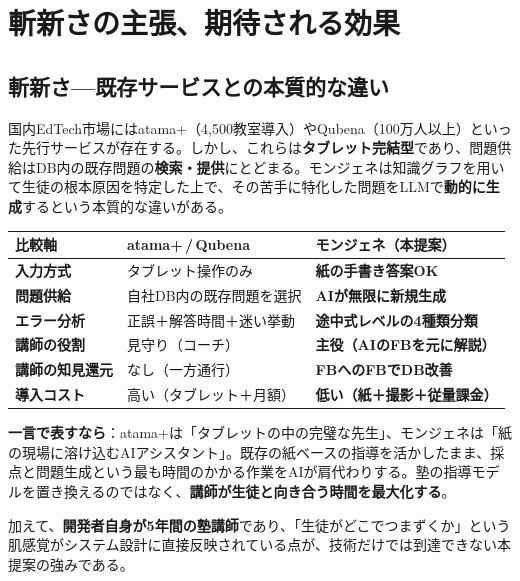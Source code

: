 \documentclass[paper=a4,fontsize=10.5bp,jafontsize=10.5bp]{jlreq}
\begin{document}
\section{斬新さの主張、期待される効果}

\subsection{斬新さ---既存サービスとの本質的な違い}

国内EdTech市場にはatama+（4,500教室導入）やQubena（100万人以上）といった先行サービスが存在する。しかし、これらは\textbf{タブレット完結型}であり、問題供給はDB内の既存問題の\textbf{検索・提供}にとどまる。モンジェネは知識グラフを用いて生徒の根本原因を特定した上で、その苦手に特化した問題をLLMで\textbf{動的に生成}するという本質的な違いがある。


\begin{footnotesize}\noindent
\begin{tabularx}{\linewidth}{>{\bfseries}l X X}
\toprule
比較軸 & atama+\,/\,Qubena & モンジェネ（本提案） \\
\midrule
入力方式 & タブレット操作のみ & \textbf{紙の手書き答案OK} \\
問題供給 & 自社DB内の既存問題を選択 & \textbf{AIが無限に新規生成} \\
エラー分析 & 正誤＋解答時間＋迷い挙動 & \textbf{途中式レベルの4種類分類} \\
講師の役割 & 見守り（コーチ） & \textbf{主役（AIのFBを元に解説）} \\
講師の知見還元 & なし（一方通行） & \textbf{FBへのFBでDB改善} \\
導入コスト & 高い（タブレット＋月額） & \textbf{低い（紙＋撮影＋従量課金）} \\
\bottomrule
\end{tabularx}
\end{footnotesize}


\begin{highlightbox}
\textbf{一言で表すなら}：atama+は「タブレットの中の完璧な先生」、モンジェネは「紙の現場に溶け込むAIアシスタント」。既存の紙ベースの指導を活かしたまま、採点と問題生成という最も時間のかかる作業をAIが肩代わりする。塾の指導モデルを置き換えるのではなく、\textbf{講師が生徒と向き合う時間を最大化する}。
\end{highlightbox}

\noindent
加えて、\textbf{開発者自身が5年間の塾講師}であり、「生徒がどこでつまずくか」という肌感覚がシステム設計に直接反映されている点が、技術だけでは到達できない本提案の強みである。
\end{document}

